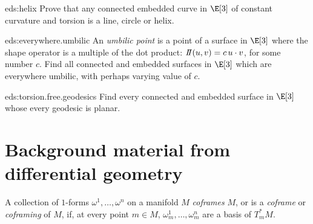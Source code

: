 \begin{problem}{eds:helix}
Prove that any connected embedded curve in \(\E[3]\) of constant curvature and torsion is a line, circle or helix.
\end{problem}
\begin{problem}{eds:everywhere.umbilic}
An \emph{umbilic point} is a point of a surface in \(\E[3]\) where the shape operator is a multiple of the dot product: \(\shapeOp(u,v)=c \,u\cdot v\), for some number \(c\).
Find all connected and embedded surfaces in \(\E[3]\) which are everywhere umbilic, with perhaps varying value of \(c\).
\end{problem}
\begin{problem}{eds:torsion.free.geodesics}
Find every connected and embedded surface in \(\E[3]\) whose every geodesic is planar.
\end{problem}

\section{Background material from differential geometry}
A collection of \(1\)-forms \(\omega^1,\dots,\omega^n\) on a manifold \(M\) \emph{coframes} \(M\), or is a \emph{coframe} or \emph{coframing} of \(M\), if, at every point \(m \in M\), \(\omega^1_m,\dots,\omega^n_m\) are a basis of \(T^*_m M\).


